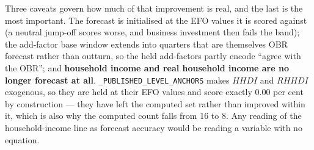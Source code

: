 Three caveats govern how much of that improvement is real, and the last is the most important. The forecast is initialised at the EFO values it is scored against (a neutral jump-off scores worse, and business investment then fails the band); the add-factor base window extends into quarters that are themselves OBR forecast rather than outturn, so the held add-factors partly encode ``agree with the OBR''; and \textbf{household income and real household income are no longer forecast at all}. \texttt{\_PUBLISHED\_LEVEL\_ANCHORS} makes $HHDI$ and $RHHDI$ exogenous, so they are held at their EFO values and score exactly 0.00 per cent by construction --- they have left the computed set rather than improved within it, which is also why the computed count falls from 16 to 8. Any reading of the household-income line as forecast accuracy would be reading a variable with no equation.
